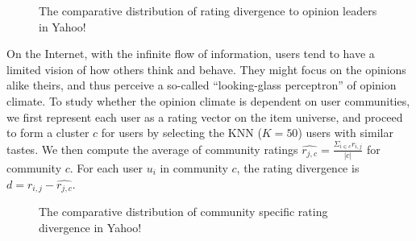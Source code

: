 \documentclass{sig-alternate}
\begin{document}
\begin{figure}[htbp]
\centering
\centering
{}
\caption{The comparative distribution of rating divergence to opinion leaders in Yahoo!}\label{fig:leader}
\end{figure}

On the Internet, with the infinite flow of information, users tend to have a limited vision of how others think and behave. They might focus on the opinions alike theirs, and thus perceive a so-called ``looking-glass perceptron'' of opinion climate. To study whether the opinion climate is dependent on user communities, we first represent each user as a rating vector on the item universe, and proceed to form a cluster $c$ for users by selecting the KNN ($K=50$) users with similar tastes.  We then compute the average of community ratings $\hat{r_{j,c}}=\frac{\Sigma_{i\in c}r_{i,j}}{|c|}$ for community $c$. For each user $u_i$ in community $c$, the rating divergence is   $d=r_{i,j}-\hat{r_{j,c}}$.

\begin{figure}[htbp]
\centering
\centering
{}
\caption{The comparative  distribution of community specific rating divergence in Yahoo!}\label{fig:community}
\end{figure}
\end{document}

